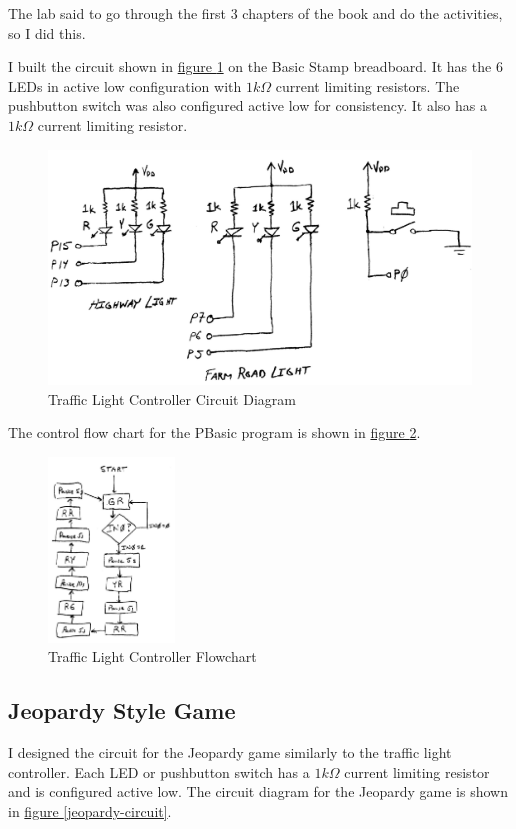 \documentclass[11pt]{article}
\begin{document}
The lab said to go through the first 3 chapters of the book and do the activities, so I did this.

I built the circuit shown in \hyperref[traffic-light-circuit]{figure \ref{traffic-light-circuit}} on the Basic Stamp breadboard.
It has the 6 LEDs in active low configuration with $1k\Omega$ current limiting resistors.
The pushbutton switch was also configured active low for consistency.
It also has a $1k\Omega$ current limiting resistor.

\begin{figure}[h!]
\centering
\includegraphics[width=.6\textwidth]{traffic-light-circuit.pdf}
\caption{Traffic Light Controller Circuit Diagram}
\label{traffic-light-circuit}
\end{figure}

The control flow chart for the PBasic program is shown in \hyperref[traffic-light-flowchart]{figure \ref{traffic-light-flowchart}}.

\begin{figure}[ht]
\centering
\includegraphics[width=0.3\textwidth]{traffic-light-flowchart.pdf}
\caption{Traffic Light Controller Flowchart}
\label{traffic-light-flowchart}
\end{figure}

\subsection{Jeopardy Style Game}

I designed the circuit for the Jeopardy game similarly to the traffic light controller.
Each LED or pushbutton switch has a $1k\Omega$ current limiting resistor and is configured active low.
The circuit diagram for the Jeopardy game is shown in \hyperref[jeopardy-circuit]{figure \ref{jeopardy-circuit}}.
\end{document}
